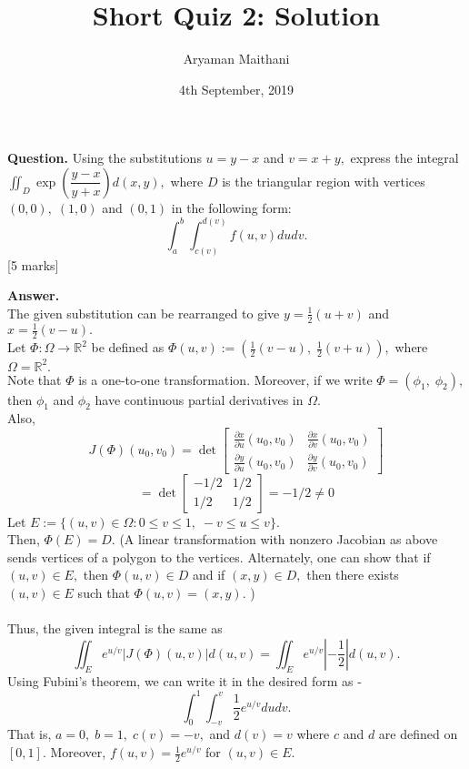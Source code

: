 \documentclass{article}
\title{Short Quiz 2: Solution}      %
\author{Aryaman Maithani}
\date{4th September, 2019}  		 %
\begin{document}
\maketitle

\hrulefill

\textbf{Question.} Using the substitutions $u = y - x$ and $v = x + y,$ express the integral $\displaystyle\iint_D\exp\left(\dfrac{y-x}{y+x}\right)d(x, y),$ where $D$ is the triangular region with vertices $(0,0),\;(1,0)$ and $(0,1)$ in the following form:
\[\int_{a}^{b} \int_{c(v)}^{d(v)} f(u,v) du dv. \] 
\hfill [5 marks]

\hrulefill

\textbf{Answer.}\\
The given substitution can be rearranged to give $y = \frac{1}{2}(u + v)$ and $x = \frac{1}{2}(v - u).$\\
Let $\Phi:\Omega\to\mathbb{R}^2$ be defined as $\Phi(u, v) := \left(\frac{1}{2}(v - u),\;\frac{1}{2}(v + u)\right),$ where $\Omega = \mathbb{R}^2.$\\
Note that $\Phi$ is a one-to-one transformation. Moreover, if we write $\Phi = (\phi_1,\;\phi_2),$ then $\phi_1$ and $\phi_2$ have continuous partial derivatives in $\Omega.$\\
Also,
\[J(\Phi)\left(u_{0}, v_{0}\right) =\operatorname{det}\left[\begin{array}{ll}{\frac{\partial x}{\partial u}\left(u_{0}, v_{0}\right)} & {\frac{\partial x}{\partial v}\left(u_{0}, v_{0}\right)} \\ {\frac{\partial y}{\partial u}\left(u_{0}, v_{0}\right)} & {\frac{\partial y}{\partial v}\left(u_{0}, v_{0}\right)}\end{array}\right]\]
\[ = \operatorname{det}\left[\begin{array}{ll}{-1/2} & {1/2} \\ {1/2} & {1/2}\end{array}\right] = -1/2 \neq 0\]
Let $E := \{(u, v) \in \Omega : 0 \le v \le 1,\; -v \le u \le v\}.$\\
Then, $\Phi(E) = D.$ (A linear transformation with nonzero Jacobian as above sends vertices of a polygon to the vertices. Alternately, one can show that if $(u, v) \in E,$ then $\Phi(u, v) \in D$ and if $(x, y) \in D,$ then there exists $(u, v) \in E$ such that $\Phi(u, v) = (x, y).$ )\\~\\
Thus, the given integral is the same as 
\[\iint_E e^{u/v}|J(\Phi)(u, v)|d(u, v) = \iint_Ee^{u/v}\left|-\frac{1}{2}\right|d(u, v).\]
Using Fubini's theorem, we can write it in the desired form as -
\[\int_{0}^{1} \int_{-v}^{v} \frac{1}{2}e^{u/v} du dv. \]
That is, $a = 0,\;b = 1,\;c(v) = -v,$ and $d(v) = v$ where $c$ and $d$ are defined on $[0, 1].$ Moreover, $f(u, v) = \frac{1}{2}e^{u/v}$ for $(u, v) \in E.$
\end{document}
